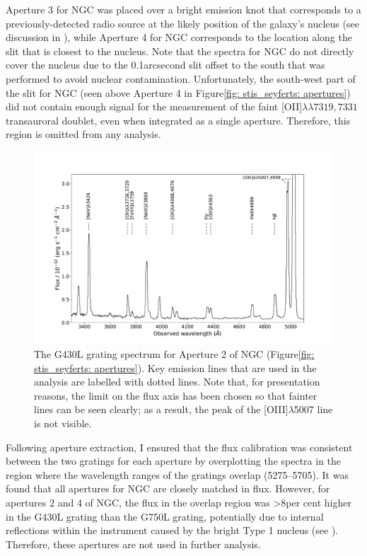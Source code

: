 Aperture 3 for NGC was placed over a bright emission knot that corresponds to a previously-detected radio source at the likely position of the galaxy's nucleus (see discussion in \citealt{Kraemer2000II}), while Aperture 4 for NGC corresponds to the location along the slit that is closest to the nucleus. Note that the spectra for NGC do not directly cover the nucleus due to the 0.1\;arcsecond slit offset to the south that was performed to avoid nuclear contamination. Unfortunately, the south-west part of the slit for NGC (seen above Aperture 4 in Figure\;\ref{fig: stis_seyferts: apertures}) did not contain enough signal for the measurement of the faint [OII]$\lambda\lambda7319,7331$ transauroral doublet, even when integrated as a single aperture. Therefore, this region is omitted from any analysis. 

\begin{figure}[!ht]
    \centering
    \includegraphics[width=\linewidth]{figures/stis_seyferts/ngc1068_g430l_ap2.pdf}
    \caption[HST/STIS G430L grating spectrum for Aperture 2 of NGC.]{The G430L grating spectrum for Aperture 2 of NGC (Figure\;\ref{fig: stis_seyferts: apertures}). Key emission lines that are used in the analysis are labelled with dotted lines. Note that, for presentation reasons, the limit on the flux axis has been chosen so that fainter lines can be seen clearly; as a result, the peak of the [OIII]$\lambda$5007 line is not visible.}
    \label{fig: stis_seyferts: ngc1068_g430l_ap2}
\end{figure}

Following aperture extraction, I ensured that the flux calibration was consistent between the two gratings for each aperture by overplotting the spectra in the region where the wavelength ranges of the gratings overlap (5275--5705\;{\AA}). It was found that all apertures for NGC are closely matched in flux. However, for apertures 2 and 4 of NGC, the flux in the overlap region was \textgreater8\;per cent higher in the G430L grating than the G750L grating, potentially due to internal reflections within the instrument caused by the bright Type 1 nucleus (see \citealt{Nelson2000}). Therefore, these apertures are not used in further analysis. 

